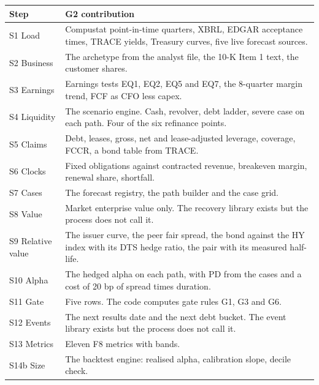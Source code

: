 {\footnotesize
\begin{tabularx}{\linewidth}{@{}>{\raggedright\arraybackslash}p{24mm}>{\raggedright\arraybackslash}X@{}}
\toprule
Step & G2 contribution \\
\midrule
S1 Load & Compustat point-in-time quarters, XBRL, EDGAR acceptance times, TRACE yields, Treasury curves, five live forecast sources. \\
S2 Business & The archetype from the analyst file, the 10-K Item 1 text, the customer shares. \\
S3 Earnings & Earnings tests EQ1, EQ2, EQ5 and EQ7, the 8-quarter margin trend, FCF as CFO less capex. \\
S4 Liquidity & The scenario engine. Cash, revolver, debt ladder, severe case on each path. Four of the six refinance points. \\
S5 Claims & Debt, leases, gross, net and lease-adjusted leverage, coverage, FCCR, a bond table from TRACE. \\
S6 Clocks & Fixed obligations against contracted revenue, breakeven margin, renewal share, shortfall. \\
S7 Cases & The forecast registry, the path builder and the case grid. \\
S8 Value & Market enterprise value only. The recovery library exists but the process does not call it. \\
S9 Relative value & The issuer curve, the peer fair spread, the bond against the HY index with its DTS hedge ratio, the pair with its measured half-life. \\
S10 Alpha & The hedged alpha on each path, with PD from the cases and a cost of 20 bp of spread times duration. \\
S11 Gate & Five rows. The code computes gate rules G1, G3 and G6. \\
S12 Events & The next results date and the next debt bucket. The event library exists but the process does not call it. \\
S13 Metrics & Eleven F8 metrics with bands. \\
S14b Size & The backtest engine: realised alpha, calibration slope, decile check. \\
\bottomrule
\end{tabularx}
}

